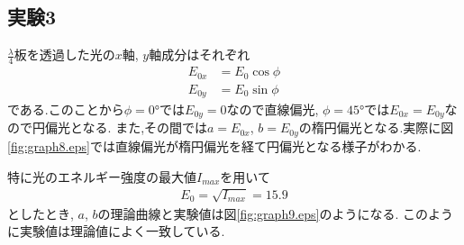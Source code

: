 \subsection{実験3}
$\frac{\lambda}{4}$板を透過した光の$x$軸, $y$軸成分はそれぞれ
\begin{align}
  \label{equ:con_3_x}
  E_{0x}&=E_0\cos\phi\\
  \label{equ:con_3_y}
  E_{0y}&=E_0\sin\phi
\end{align}
である.このことから$\phi=0\si{\degree}$では$E_{0y}=0$なので直線偏光, $\phi=45\si{\degree}$では$E_{0x}=E_{0y}$なので円偏光となる.
また,その間では$a=E_{0x}$, $b=E_{0y}$の楕円偏光となる.実際に図\ref{fig:graph8.eps}では直線偏光が楕円偏光を経て円偏光となる様子がわかる.

特に光のエネルギー強度の最大値$I_{max}$を用いて
\begin{align}
  E_0=\sqrt{I_{max}}=15.9
\end{align}
としたとき, $a$, $b$の理論曲線と実験値は図\ref{fig:graph9.eps}のようになる.
このように実験値は理論値によく一致している.
